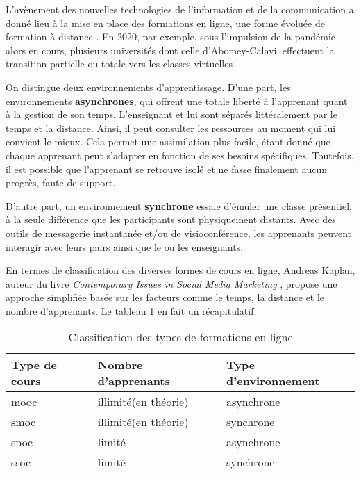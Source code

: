 L'avènement des nouvelles technologies de l’information et de la communication 
a donné lieu à la mise en place des formations en ligne, 
une forme évoluée de formation à distance \cite{online_learning}. 
En 2020, par exemple, sous l’impulsion de la pandémie alors en cours, 
plusieurs universités dont celle d’Abomey-Calavi, 
effectuent la transition partielle ou totale vers les classes virtuelles \cite{etudiant_dot_bj}.

On distingue deux environnements d’apprentissage. 
D’une part, les environnements \textbf{asynchrones}, qui offrent une totale liberté à l'apprenant quant à la gestion de son temps. 
L’enseignant et lui sont séparés littéralement par le temps et la distance. Ainsi, il peut consulter les ressources au moment qui lui convient le mieux. 
Cela permet une assimilation plus facile, étant donné que chaque apprenant peut s’adapter en fonction de ses besoins spécifiques. 
Toutefois, il est possible que l’apprenant se retrouve isolé et ne fasse finalement aucun progrès, faute de support.

D’autre part, un environnement \textbf{synchrone} essaie d'émuler une classe présentiel, 
à la seule différence que les participants sont physiquement distants. 
Avec des outils de messagerie instantanée et/ou de visioconférence, 
les apprenants peuvent interagir avec leurs pairs ainsi que le ou les enseignants.

En termes de classification des diverses formes de cours en ligne, Andreas Kaplan, 
auteur du livre \textit{Contemporary Issues in Social Media Marketing} \cite{andreas_kaplan_classfication}, propose une approche simplifiée basée sur les facteurs 
comme le temps, la distance et le nombre d’apprenants. 
Le tableau \ref{course_classification} en fait un récapitulatif.

\begin{table}[H]
  \centering
\caption{Classification des types de formations en ligne}
\begin{tabular}{|l|l|l|}
  \hline
  Type de cours &  Nombre d’apprenants &  Type d’environnement \\
  \hline
  \acrfull{mooc} & illimité(en théorie) & asynchrone \\
  \hline
  \acrfull{smoc} & illimité(en théorie) & synchrone \\
  \hline
  \acrfull{spoc} & limité & asynchrone \\
  \hline
  \acrfull{ssoc} & limité & synchrone \\
  \hline
\end{tabular}
\label{course_classification}
\end{table}

